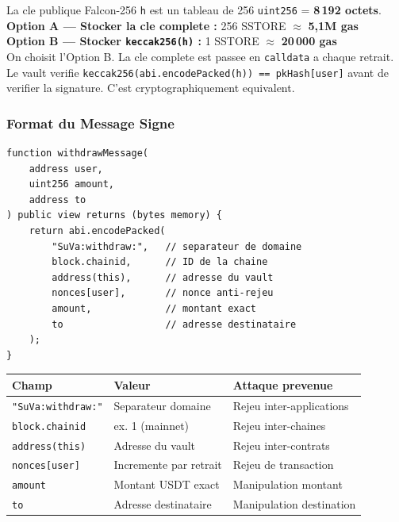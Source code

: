 \documentclass[11pt,a4paper]{article}
\begin{document}
\begin{infobox}
La cle publique Falcon-256 \texttt{h} est un tableau de 256 \texttt{uint256} = \textbf{8\,192 octets}.\\[4pt]
\textbf{Option A --- Stocker la cle complete :} 256 SSTORE $\approx$ \textbf{5,1M gas}\\
\textbf{Option B --- Stocker \texttt{keccak256(h)} :} 1 SSTORE $\approx$ \textbf{20\,000 gas}\\[4pt]
On choisit l'Option B. La cle complete est passee en \texttt{calldata} a chaque retrait.
Le vault verifie \texttt{keccak256(abi.encodePacked(h)) == pkHash[user]} avant de verifier la
signature. C'est cryptographiquement equivalent.
\end{infobox}

\subsubsection{Format du Message Signe}

\begin{lstlisting}[style=solidity, caption={withdrawMessage() --- le payload signe}]
function withdrawMessage(
    address user,
    uint256 amount,
    address to
) public view returns (bytes memory) {
    return abi.encodePacked(
        "SuVa:withdraw:",   // separateur de domaine
        block.chainid,      // ID de la chaine
        address(this),      // adresse du vault
        nonces[user],       // nonce anti-rejeu
        amount,             // montant exact
        to                  // adresse destinataire
    );
}
\end{lstlisting}

\begin{center}
\begin{tabular}{lll}
\toprule
\textbf{Champ} & \textbf{Valeur} & \textbf{Attaque prevenue} \\
\midrule
\texttt{"SuVa:withdraw:"} & Separateur domaine    & Rejeu inter-applications \\
\texttt{block.chainid}    & ex. 1 (mainnet)        & Rejeu inter-chaines \\
\texttt{address(this)}    & Adresse du vault       & Rejeu inter-contrats \\
\texttt{nonces[user]}     & Incremente par retrait & Rejeu de transaction \\
\texttt{amount}           & Montant USDT exact     & Manipulation montant \\
\texttt{to}               & Adresse destinataire   & Manipulation destination \\
\bottomrule
\end{tabular}
\end{center}
\end{document}
